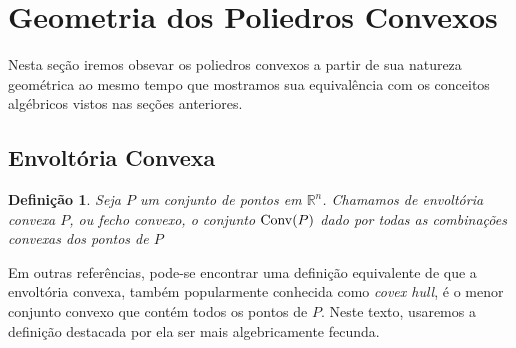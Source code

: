 \newtheorem{def:convex hull}{Definição}[section]
\newtheorem{def:independencia convexa}[def:conjunto convexo]{Definição}
\newtheorem{def:simplex}[def:conjunto convexo]{Definição}
\newtheorem{def:combinação afim}[def:conjunto convexo]{Definição}

\newtheorem{prop:redundancia}[prop:combinação convexa]{Proposição}
\newtheorem{prop:pontos extremos na fronteira}[prop:combinação convexa]{Proposição}
\newtheorem{prop:conjuntos convexos fechados}[prop:combinação convexa]{Proposição}
\newtheorem{prop:conjuntos convexos limitados}[prop:combinação convexa]{Proposição}


\newtheorem{lemma:afim}{Lema}[section]


\newtheorem{thm:caratheodory}{Teorema}[section]
\newtheorem{thm:conjuntos convexos compactos}{Teorema}[section]


\newtheorem{cor:caratheodory}{Corolário}[section]

\section{Geometria dos Poliedros Convexos}

Nesta seção iremos obsevar os poliedros convexos a partir de sua
natureza geométrica ao mesmo tempo que mostramos sua equivalência com
os conceitos algébricos vistos nas seções anteriores.

\subsection{Envoltória Convexa}

\begin{def:convex hull}
	\label{def:convex hull}
	Seja $P$ um conjunto de pontos em $\mathbb{R}^n$. Chamamos de envoltória
	convexa $P$, ou fecho convexo, o conjunto
	$\mathrm{Conv}(P)$ dado por todas as combinações convexas dos pontos de $P$
\end{def:convex hull}

Em outras referências, pode-se encontrar uma definição equivalente de que a
envoltória convexa, também popularmente conhecida como \textit{covex hull},
é o menor conjunto convexo que contém todos os pontos de $P$. Neste texto,
usaremos a definição destacada por ela ser mais algebricamente fecunda.


